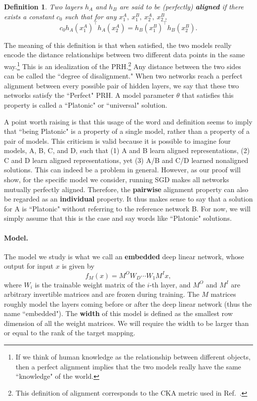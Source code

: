 \documentclass[11pt]{article}
\theoremstyle{plain}
\newtheorem{definition}{Definition}
\begin{document}
\begin{definition}
    Two layers $h_A$ and $h_B$ are said to be (perfectly) \textbf{aligned} if there exists a constant $c_0$ such that for any $x_1^A,\ x_1^B,\ x_2^A,\ x_2^B$, 
    \begin{equation}\label{eq: universal alignment}
        c_0 h_A(x_1^A)^\top h_A(x_2^A) = h_B(x_1^B)^\top h_B(x_2^B).
    \end{equation}
\end{definition}
The meaning of this definition is that when satisfied, the two models really encode the distance relationships between two different data points in the same way.\footnote{If we think of human knowledge as the relationship between different objects, then a perfect alignment implies that the two models really have the same ``knowledge" of the world.} This is an idealization of the PRH.\footnote{This definition of alignment corresponds to the CKA metric used in Ref.~\cite{huh2024platonic}.} Any distance between the two sides can be called the ``degree of disalignment." When two networks reach a perfect alignment between every possible pair of hidden layers, we say that these two networks satisfy the ``Perfect" PRH. A model parameter $\theta$ that satisfies this property is called a ``Platonic" or ``universal" solution.

A point worth raising is that this usage of the word and definition seems to imply that ``being Platonic" is a property of a single model, rather than a property of a pair of models. This criticism is valid because it is possible to imagine four models, A, B, C, and D, such that (1) A and B learn aligned representations, (2) C and D learn aligned representations, yet (3) A/B and C/D learned nonaligned solutions. This can indeed be a problem in general. However, as our proof will show, for the specific model we consider, running SGD makes all networks mutually perfectly aligned. Therefore, the \textbf{pairwise} alignment property can also be regarded as an \textbf{individual} property. It thus makes sense to say that a solution for A is ``Platonic" without referring to the reference network B. For now, we will simply assume that this is the case and say words like ``Platonic" solutions.



\paragraph{Model.} The model we study is what we call an \textbf{embedded} deep linear network, whose output for input $x$ is given by
\begin{equation}
    f_M(x) = M^OW_D\cdots W_1M^I x,
\end{equation}
where $W_i$ is the trainable weight matrix of the $i$-th layer, and $M^O$ and $M^I$ are arbitrary invertible matrices and are frozen during training. The $M$ matrices roughly model the layers coming before or after the deep linear network (thus the name ``embedded"). The \textbf{width} of this model is defined as the smallest row dimension of all the weight matrices. We will require the width to be larger than or equal to the rank of the target mapping.
\end{document}
